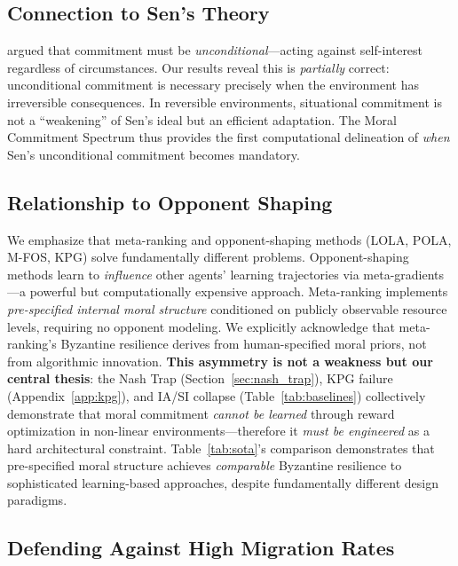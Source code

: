 \documentclass{article}
\begin{document}
\subsection{Connection to Sen's Theory}

\citet{sen1977rational} argued that commitment must be \emph{unconditional}---acting against self-interest regardless of circumstances.
Our results reveal this is \emph{partially} correct: unconditional commitment is necessary precisely when the environment has irreversible consequences.
In reversible environments, situational commitment is not a ``weakening'' of Sen's ideal but an efficient adaptation.
The Moral Commitment Spectrum thus provides the first computational delineation of \emph{when} Sen's unconditional commitment becomes mandatory.

\subsection{Relationship to Opponent Shaping}

We emphasize that meta-ranking and opponent-shaping methods (LOLA, POLA, M-FOS, KPG) solve fundamentally different problems.
Opponent-shaping methods learn to \emph{influence} other agents' learning trajectories via meta-gradients---a powerful but computationally expensive approach.
Meta-ranking implements \emph{pre-specified internal moral structure} conditioned on publicly observable resource levels, requiring no opponent modeling.
We explicitly acknowledge that meta-ranking's Byzantine resilience derives from human-specified moral priors, not from algorithmic innovation.
\textbf{This asymmetry is not a weakness but our central thesis}: the Nash Trap (Section~\ref{sec:nash_trap}), KPG failure (Appendix~\ref{app:kpg}), and IA/SI collapse (Table~\ref{tab:baselines}) collectively demonstrate that moral commitment \emph{cannot be learned} through reward optimization in non-linear environments---therefore it \emph{must be engineered} as a hard architectural constraint.
Table~\ref{tab:sota}'s comparison demonstrates that pre-specified moral structure achieves \emph{comparable} Byzantine resilience to sophisticated learning-based approaches, despite fundamentally different design paradigms.

\subsection{Defending Against High Migration Rates}
\label{sec:migration}
\end{document}
